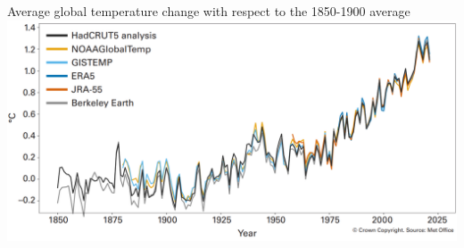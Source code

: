 \begin{frame}
\begin{scriptsize}
\begin{columns}
      \begin{center}
        {\scriptsize \cb Average global temperature change with respect to the 1850-1900 average}
          \includegraphics[width=1.0\textwidth]{plots/WMO_temperature}
      \end{center}
    \end{columns}

  \end{scriptsize}
  \end{frame}


